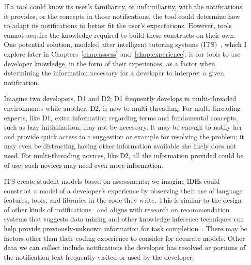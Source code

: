 If a tool could know its user's familiarity, or unfamiliarity, with the notifications it provides, or the concepts in those notifications, the tool could determine how to adapt its notifications to better fit the user's expectations.
However, tools cannot acquire the knowledge required to build these constructs on their own. 
One potential solution, modeled after intelligent tutoring systems (ITS)~\cite{tutoringsys}, which I explore later in Chapters~\ref{chap:assess} and~\ref{chap:experience}, is for tools to use developer knowledge, in the form of their experiences, as a factor when determining the information necessary for a developer to interpret a given notification.



Imagine two developers, D1 and D2; D1 frequently develops in multi-threaded environments while another, D2, is new to multi-threading. 
For multi-threading experts, like D1, extra information regarding terms and fundamental concepts, such as lazy initialization, may not be necessary. 
It may be enough to notify her and provide quick access to a suggestion or example for resolving the problem; it may even be distracting having other information available she likely does not need. 
For multi-threading novices, like D2, all the information provided could be of use; such novices may need even more information.

ITS create student models based on assessments; we imagine IDEs could construct a model of a
developer's experience by observing their use of language features, tools, and libraries in the code they write.
This is similar to the design of other kinds of notifications~\cite{mccrickard2003attuning, sow2005tasks, Zhang:2005} 
and aligns with research on recommendation systems that suggests data mining and 
other knowledge inference techniques can help provide previously-unknown 
information for task completion~\cite{robillard2014recommendation}.
There may be factors other than their coding experience to consider for accurate models. Other data we can collect include notifications the developer has resolved or portions of the notification text frequently visited or used by the developer.

